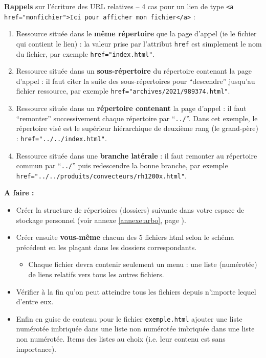 \documentclass[a4paper,11pt]{article}
\begin{document}
\textbf{Rappels} sur l'écriture des URL relatives -- 4 cas pour un lien de type \texttt{<a href="monfichier">Ici pour afficher mon fichier</a>} :

\begin{enumerate}
    \item Ressource située dans le \textbf{même répertoire} que la page d'appel (ie le fichier qui contient le lien) : la valeur prise par l'attribut \texttt{href} est simplement le nom du fichier, par exemple \texttt{href="index.html"}.
    \item Ressource située dans un \textbf{sous-répertoire} du répertoire contenant la page d'appel : il faut citer la suite des sous-répertoires pour ``descendre'' jusqu'au fichier ressource, par exemple \texttt{href="archives/2021/989374.html"}.
    \item Ressource située dans un \textbf{répertoire contenant} la page d'appel : il faut ``remonter'' successivement chaque répertoire par ``\texttt{../}''. Dans cet exemple, le répertoire visé est le supérieur hiérarchique de deuxième rang (le grand-père) : \texttt{href="../../index.html"}.
    \item Ressource située dans une \textbf{branche latérale} : il faut remonter au répertoire commun par ``\texttt{../}'' puis redescendre la bonne branche, par exemple \texttt{href="../../produits/convecteurs/rh1200x.html"}.
\end{enumerate}

\begin{afaire}
\textbf{A faire :}

\begin{itemize}
    \item Créer la structure de répertoires (dossiers) suivante dans votre espace de stockage personnel
    (voir annexe \ref{annexe:arbo}, page \pageref{annexe:arbo}).
    \item Créer ensuite \textbf{vous-même} chacun des 5 fichiers html selon le schéma précédent en les plaçant dans les dossiers correspondants.
    \begin{itemize}
        \item Chaque fichier devra contenir seulement un menu : une liste (numérotée) de liens relatifs vers tous les autres fichiers.
    \end{itemize}
    \item Vérifier à la fin qu'on peut atteindre tous les fichiers depuis n'importe lequel d'entre eux.
    \item Enfin en guise de contenu pour le fichier \texttt{exemple.html} ajouter une liste numérotée imbriquée dans une liste non numérotée imbriquée dans une liste non numérotée. Items des listes au choix (i.e. leur contenu est sans importance).
\end{itemize}
\end{afaire}
\end{document}
